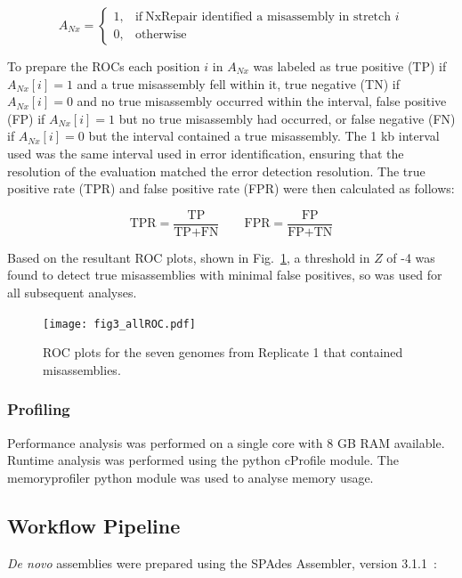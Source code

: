 \documentclass[fleqn,10pt]{wlpeerj}
\begin{document}
\begin{equation}
    A_{Nx}=
    \begin{cases}
      1, & \text{if}\ \text{NxRepair identified a misassembly in stretch $i$} \\
      0, & \text{otherwise}
    \end{cases}
  \label{eq:found}
\end{equation}

To prepare the ROCs each position $i$ in $A_{Nx}$ was labeled as true positive (TP) if $A_{Nx}[i] = 1$ and a true misassembly fell within it, true negative (TN) if $A_{Nx}[i] = 0$ and no true misassembly occurred within the interval, false positive (FP) if $A_{Nx}[i] = 1$ but no true misassembly had occurred, or false negative (FN) if $A_{Nx}[i] = 0$ but the interval contained a true misassembly. The 1 kb interval used was the same interval used in error identification, ensuring that the resolution of the evaluation matched the error detection resolution. The true positive rate (TPR) and false positive rate (FPR) were then calculated as follows:

\begin{equation}
\text{TPR} = \frac{\text{TP}}{\text{TP} + \text{FN}} \qquad \text{FPR} = \frac{\text{FP}}{\text{FP} + \text{TN}}
\label{eq:tpr}
\end{equation}

Based on the resultant ROC plots, shown in Fig.~\ref{fig:ROCs}, a threshold in $Z$ of -4 was found to detect true misassemblies with minimal false positives, so was used for all subsequent analyses. 

\begin{figure}
\centerline{\texttt{[image: fig3\_allROC.pdf]}}
\caption{ROC plots for the seven genomes from Replicate 1 that contained misassemblies.\label{fig:ROCs}}
\end{figure}

\subsubsection*{Profiling}
Performance analysis was performed on a single core with 8 GB RAM available. Runtime analysis was performed using the python cProfile module. The memoryprofiler python module was used to analyse memory usage.

\subsection*{Workflow Pipeline}
\textit{De novo} assemblies were prepared using the SPAdes Assembler, version 3.1.1~\citep{Bankevich2012}:
\end{document}
